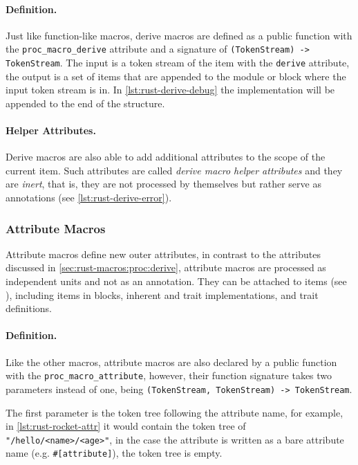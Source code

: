 \paragraph{Definition.}
Just like function-like macros,
derive macros are defined as a public function with the \texttt{proc\_macro\_derive} attribute
and a signature of \texttt{(TokenStream) -> TokenStream}.
The input is a token stream of the item with the \texttt{derive} attribute,
the output is a set of items that are appended to the module or block where the input token stream is in.
In \autoref{lst:rust-derive-debug} the  implementation will be appended to the end of the structure.

\paragraph{Helper Attributes.}
Derive macros are also able to add additional attributes to the scope of the current item.
Such attributes are called \emph{derive macro helper attributes} and they are \emph{inert},
that is, they are not processed by themselves but rather serve as annotations (see \autoref{lst:rust-derive-error}).





\subsubsection*{Attribute Macros}\label{sec:rust-macros:proc:attr}
Attribute macros define new outer attributes,
in contrast to the attributes discussed in \autoref{sec:rust-macros:proc:derive},
attribute macros are processed as independent units and not as an annotation.
They can be attached to items (see \autocite[Section 6]{RustRef2021}),
including items in  blocks, inherent and trait implementations, and trait definitions.

\paragraph{Definition.}
Like the other macros, attribute macros are also declared by a public function with the \texttt{proc\_macro\_attribute},
however, their function signature takes two parameters instead of one, being \texttt{(TokenStream, TokenStream) -> TokenStream}.

The first parameter is the token tree following the attribute name, for example, in \autoref{lst:rust-rocket-attr}
it would contain the token tree of \ttt{(}\textcolor{stringred}{\texttt{"/hello/<name>/<age>"}}\ttt{)},
in the case the attribute is written as a bare attribute name (e.g. \textcolor{attrgreen}{\texttt{\#[attribute]}}),
the token tree is empty.

